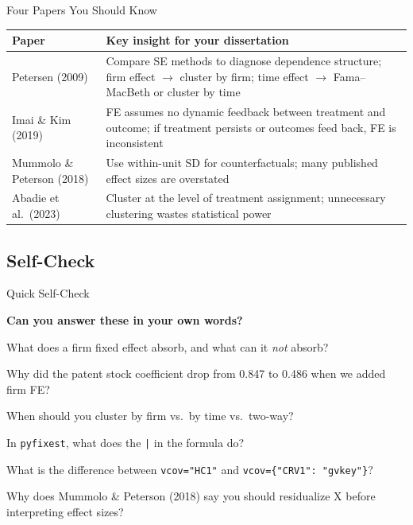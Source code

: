 \documentclass[9pt,aspectratio=169]{beamer}
\begin{document}
\begin{frame}{Four Papers You Should Know}

\begin{tabular}{@{}lp{9.5cm}@{}}
\toprule
\textbf{Paper} & \textbf{Key insight for your dissertation} \\
\midrule
Petersen (2009) & Compare SE methods to diagnose dependence structure; firm effect $\to$ cluster by firm; time effect $\to$ Fama--MacBeth or cluster by time \\[0.5em]
Imai \& Kim (2019) & FE assumes no dynamic feedback between treatment and outcome; if treatment persists or outcomes feed back, FE is inconsistent \\[0.5em]
Mummolo \& Peterson (2018) & Use within-unit SD for counterfactuals; many published effect sizes are overstated \\[0.5em]
Abadie et al.\ (2023) & Cluster at the level of treatment assignment; unnecessary clustering wastes statistical power \\
\bottomrule
\end{tabular}

\end{frame}


\subsection{Self-Check}
\begin{frame}[fragile]{Quick Self-Check}

\textbf{Can you answer these in your own words?}

\be
    \item What does a firm fixed effect absorb, and what can it \textit{not} absorb?
    \item Why did the patent stock coefficient drop from 0.847 to 0.486 when we added firm FE?
    \item When should you cluster by firm vs.\ by time vs.\ two-way?
    \item In \texttt{pyfixest}, what does the \texttt{|} in the formula do?
    \item What is the difference between \texttt{vcov="HC1"} and \texttt{vcov=\{"CRV1": "gvkey"\}}?
    \item Why does Mummolo \& Peterson (2018) say you should residualize X before interpreting effect sizes?
\ee

\end{frame}
\end{document}
